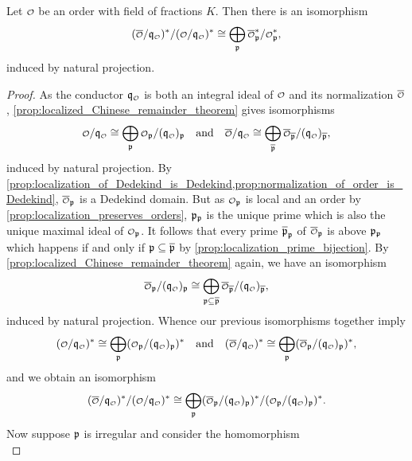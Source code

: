     \begin{proposition}\label{prop:quotient_of_quotient_of_conductor_isomorphism}
      Let \(\smc{O}\) be an order with field of fractions \(K\). Then there is an isomorphism
      \[
        (\conj{\smc{O}}/\mf{q}_{\smc{O}})^{\ast}/(\smc{O}/\mf{q}_{\smc{O}})^{\ast} \cong \bigop_{\mf{p}}\conj{\smc{O}}_{\mf{p}}^{\ast}/\smc{O}_{\mf{p}}^{\ast},
      \]
      induced by natural projection.
    \end{proposition}
    \begin{proof}
      As the conductor \(\mf{q}_{\smc{O}}\) is both an integral ideal of \(\smc{O}\) and its normalization \(\conj{\smc{O}}\), \cref{prop:localized_Chinese_remainder_theorem} gives isomorphisms
      \[
        \smc{O}/\mf{q}_{\smc{O}} \cong \bigop_{\mf{p}}\smc{O}_{\mf{p}}/(\mf{q}_{\smc{O}})_{\mf{p}} \quad \text{and} \quad \conj{\smc{O}}/\mf{q}_{\smc{O}} \cong \bigop_{\conj{\mf{p}}}\conj{\smc{O}}_{\conj{\mf{p}}}/(\mf{q}_{\smc{O}})_{\conj{\mf{p}}},
      \]
      induced by natural projection. By \cref{prop:localization_of_Dedekind_is_Dedekind,prop:normalization_of_order_is_Dedekind}, \(\conj{\smc{O}}_{\mf{p}}\) is a Dedekind domain. But as \(\smc{O}_{\mf{p}}\) is local and an order by \cref{prop:localization_preserves_orders}, \(\mathfrak{p}_{\mathfrak{p}}\) is the unique prime which is also the unique maximal ideal of \(\smc{O}_{\mf{p}}\). It follows that every prime \(\overline{\mathfrak{p}}_{\mathfrak{p}}\) of \(\conj{\smc{O}}_{\mf{p}}\) is above \(\mathfrak{p}_{\mathfrak{p}}\) which happens if and only if \(\mathfrak{p} \subseteq \overline{\mathfrak{p}}\) by \cref{prop:localization_prime_bijection}. By \cref{prop:localized_Chinese_remainder_theorem} again, we have an isomorphism
      \[
        \conj{\smc{O}}_{\mf{p}}/(\mf{q}_{\smc{O}})_{\mf{p}} \cong \bigop_{\mf{p} \subseteq \conj{\mf{p}}}\conj{\smc{O}}_{\conj{\mf{p}}}/(\mf{q}_{\smc{O}})_{\conj{\mf{p}}},
      \]
      induced by natural projection. Whence our previous isomorphisms together imply
      \[
        (\smc{O}/\mf{q}_{\smc{O}})^{\ast} \cong \bigop_{\mf{p}}(\smc{O}_{\mf{p}}/(\mf{q}_{\smc{O}})_{\mf{p}})^{\ast} \quad \text{and} \quad (\conj{\smc{O}}/\mf{q}_{\smc{O}})^{\ast} \cong \bigop_{\mf{p}}(\conj{\smc{O}}_{\mf{p}}/(\mf{q}_{\smc{O}})_{\mf{p}})^{\ast},
      \]
      and we obtain an isomorphism
      \[
        (\conj{\smc{O}}/\mf{q}_{\smc{O}})^{\ast}/(\smc{O}/\mf{q}_{\smc{O}})^{\ast} \cong \bigop_{\mf{p}}(\conj{\smc{O}}_{\mf{p}}/(\mf{q}_{\smc{O}})_{\mf{p}})^{\ast}/(\smc{O}_{\mf{p}}/(\mf{q}_{\smc{O}})_{\mf{p}})^{\ast}.
      \]
      Now suppose \(\mathfrak{p}\) is irregular and consider the homomorphism
      \[
\]
\end{proof}
